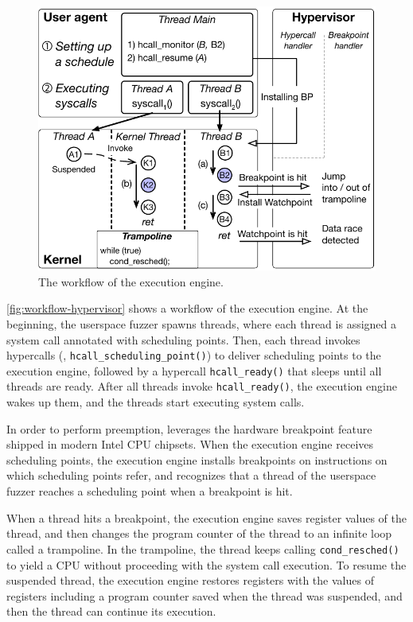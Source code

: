 %
\begin{figure}[t]
  \centering
  \includegraphics[width=0.9\linewidth]{fig/workflow-hypervisor.pdf}
  \caption{The workflow of the execution engine. }
  \label{fig:workflow-hypervisor}
\end{figure}
%
\autoref{fig:workflow-hypervisor} shows a workflow of the execution
engine.
%
At the beginning, the userspace fuzzer spawns threads, where each
thread is assigned a system call annotated with scheduling points.
%
Then, each thread invokes hypercalls (\ie,
\texttt{hcall_scheduling_point()}) to deliver scheduling points to the
execution engine, followed by a hypercall \texttt{hcall_ready()} that
sleeps until all threads are ready.
%
After all threads invoke \texttt{hcall_ready()}, the execution engine
wakes up them, and the threads start executing system calls.


\dr{}



%
In order to perform preemption, \sys leverages the hardware breakpoint
feature~\cite{hwbp} shipped in modern Intel CPU chipsets.
%
When the execution engine receives scheduling points, the execution
engine installs breakpoints on instructions on which scheduling points
refer, and recognizes that a thread of the userspace fuzzer reaches a
scheduling point when a breakpoint is hit.


When a thread hits a breakpoint, the execution engine saves register
values of the thread, and then changes the program counter of the
thread to an infinite loop called a trampoline.
%
In the trampoline, the thread keeps calling \texttt{cond_resched()} to
yield a CPU without proceeding with the system call execution.
%
To resume the suspended thread, the execution engine restores
registers with the values of registers including a program counter
saved when the thread was suspended, and then the thread can continue
its execution.


